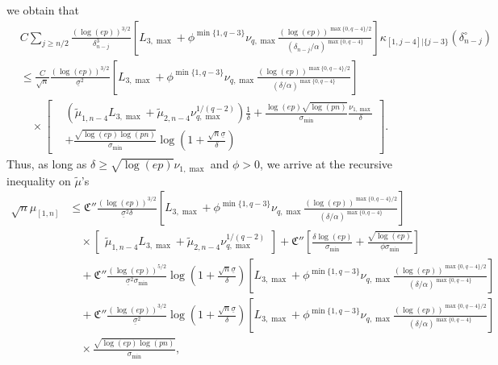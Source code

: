 \documentclass[aos]{imsart}
\begin{document}
we obtain that
\begin{equation*}
\begin{aligned}
    & C \sum_{j \geq n/2} \frac{(\log(ep))^{3/2}}{\delta_{n-j}^3}
    \left[ 
        {L}_{3,\max} + \phi^{\min\{1, q-3\}} \nu_{q,\max} \frac{ {(\log(ep))}^{\max\{0, q-4\}/2}}{(\delta_{n-j}/\alpha)^{\max\{0, q-4\}}}
    \right]
    \kappa_{[1,j-4]|\{j-3\}}(\delta_{n-j}^\circ) \\ 
    & \leq \frac{C}{\sqrt{n}} \frac{(\log(ep))^{3/2}}{\underline{\sigma}^2} 
    \left[ 
        {L}_{3,\max} + \phi^{\min\{1, q-3\}} \nu_{q,\max} \frac{ {(\log(ep))}^{\max\{0, q-4\}/2}}{(\delta/\alpha)^{\max\{0, q-4\}}}
    \right] \\
    & \quad \times \left[ \begin{aligned}
        & (\tilde\mu_{1,n-4} {L}_{3,\max} 
        +\tilde\mu_{2,n-4} \nu_{q,\max}^{1/(q-2)})
        \frac{1}{\delta} 
        +\frac{\log(ep)\sqrt{\log(pn)}}{\sigma_{\min}} \frac{\nu_{1,\max}}{\delta} \\
        & + \frac{\sqrt{\log(ep)\log(pn)}}{\sigma_{\min}} 
        \log\left(1 + \frac{\sqrt{n}\underline{\sigma}}{\delta}\right)
    \end{aligned} \right].
\end{aligned}
\end{equation*}
Thus, as long as $\delta \geq \sqrt{\log(ep)} \nu_{1,\max}$ and $\phi > 0$, we arrive at the recursive inequality on $\tilde\mu$'s 
\begin{equation} \label{eq:recursion_mu}
\begin{aligned}
    \sqrt{n} \mu_{[1,n]} 
    & \leq \mathfrak{C}'' \frac{(\log(ep))^{3/2}}{\underline{\sigma}^2 \delta} 
    \left[ 
        {L}_{3,\max} + \phi^{\min\{1, q-3\}} \nu_{q,\max} \frac{ {(\log(ep))}^{\max\{0, q-4\}/2}}{(\delta/\alpha)^{\max\{0, q-4\}}}
    \right] \\
    & \quad \times \left[ \begin{aligned}
        \tilde\mu_{1,n-4} {L}_{3,\max} 
        + \tilde\mu_{2,n-4} \nu_{q,\max}^{1/(q-2)}
    \end{aligned} \right] 
    + \mathfrak{C}'' \left[ \frac{\delta \log(ep)}{\sigma_{\min}}  
    + \frac{\sqrt{\log(ep)}}{\phi \sigma_{\min}} \right]\\
    & \quad + \mathfrak{C}'' \frac{(\log(ep))^{5/2}}{\underline{\sigma}^2\sigma_{\min}}
    \log\left(1 + \frac{\sqrt{n}\underline{\sigma}}{\delta}\right)
    \left[ 
        {L}_{3,\max} + \phi^{\min\{1, q-3\}} \nu_{q,\max} \frac{ {(\log(ep))}^{\max\{0, q-4\}/2}}{(\delta/\alpha)^{\max\{0, q-4\}}}
    \right] \\
    & \quad + \mathfrak{C}'' \frac{(\log(ep))^{3/2}}{\underline{\sigma}^2} \log\left(1 + \frac{\sqrt{n}\underline{\sigma}}{\delta}\right) 
    \left[ 
        {L}_{3,\max} + \phi^{\min\{1, q-3\}} \nu_{q,\max} \frac{ {(\log(ep))}^{\max\{0, q-4\}/2}}{(\delta/\alpha)^{\max\{0, q-4\}}}
    \right] \\
    & \quad \times \frac{\sqrt{\log(ep)\log(pn)}}{\sigma_{\min}},
\end{aligned}
\end{equation}
\end{document}
